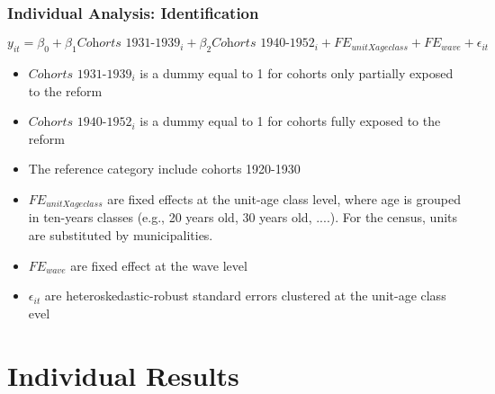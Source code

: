 \documentclass[aspectratio=169]{beamer}
\begin{document}
\begin{frame}
\frametitle{Individual Analysis: Identification}
    \begin{equation}\label{main_eq}
y_{it} =\beta_0+  \beta_1  \textit{Cohorts 1931-1939}_i + \beta_2 \textit{Cohorts 1940-1952}_i+FE_{unitXage class} +FE_{wave} +\epsilon_{it}
\end{equation}
    \begin{itemize}
        \item $\textit{Cohorts 1931-1939}_i$ is a dummy equal to 1 for cohorts only partially exposed to the reform 
    \medskip
    \item  $\textit{Cohorts 1940-1952}_i$ is a dummy equal to 1 for cohorts fully exposed to the reform
    \medskip
    \item The reference category include cohorts 1920-1930
    \medskip
    \item $FE_{unitXage class} $ are fixed effects at the unit-age class level, where age is grouped in ten-years classes (e.g., 20 years old, 30 years old, ....). For the census, units are substituted by municipalities.
    \medskip
    \item  $FE_{wave}$ are fixed effect at the wave level
    \medskip
    \item $\epsilon_{it}$ are heteroskedastic-robust standard errors clustered at the unit-age class  evel
    
    \end{itemize}

\end{frame}



\section{Individual Results}
\end{document}
